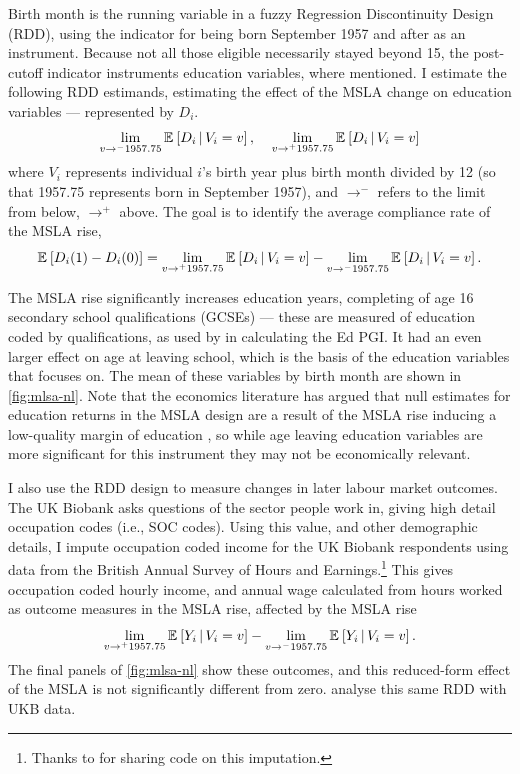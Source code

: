 Birth month is the running variable in a fuzzy Regression Discontinuity Design (RDD), using the indicator for being born September 1957 and after as an instrument.
Because not all those eligible necessarily stayed beyond 15, the post-cutoff indicator instruments education variables, where mentioned.
I estimate the following RDD estimands, estimating the effect of the MSLA change on education variables --- represented by $D_i$.
\[ \lim_{v \to^- 1957.75} \mathbb{E}_{} \left[ D_i \, \middle\vert \, V_i = v \right], \;\;\;\;
    \lim_{v \to^+ 1957.75} \mathbb{E}_{} \left[ D_i \, \middle\vert \, V_i = v \right] \]
where $V_i$ represents individual $i$'s birth year plus birth month divided by 12 (so that 1957.75 represents born in September 1957), and $\to^-$ refers to the limit from below, $\to^+$ above.
The goal is to identify the average compliance rate of the MSLA rise,
\[ \mathbb{E}_{} \left[ D_i(1) - D_i(0) \right]
    = \lim_{v \to^+ 1957.75} \mathbb{E}_{} \left[ D_i \, \middle\vert \, V_i = v \right]
        - \lim_{v \to^- 1957.75} \mathbb{E}_{} \left[ D_i \, \middle\vert \, V_i = v \right]. \]

The MSLA rise significantly increases education years, completing of age 16 secondary school qualifications (GCSEs) --- these are measured of education coded by qualifications, as used by \cite{okbay2022polygenic} in calculating the Ed PGI.
It had an even larger effect on age at leaving school, which is the basis of the education variables that \cite{barcellos2021effect} focuses on.
The mean of these variables by birth month are shown in \autoref{fig:mlsa-nl}.
Note that the economics literature has argued that null estimates for education returns in the MSLA design are a result of the MSLA rise inducing a low-quality margin of education \citep{clark2013effect}, so while age leaving education variables are more significant for this instrument they may not be economically relevant.

I also use the RDD design to measure changes in later labour market outcomes.
The UK Biobank asks questions of the sector people work in, giving high detail occupation codes (i.e., SOC codes).
Using this value, and other demographic details, I impute occupation coded income for the UK Biobank respondents using data from the British Annual Survey of Hours and Earnings.\footnote{
    Thanks to \cite{kweon2025associations} for sharing code on this imputation.
}
This gives occupation coded hourly income, and annual wage calculated from hours worked as outcome measures in the MSLA rise, affected by the MSLA rise
\[ \lim_{v \to^+ 1957.75} \mathbb{E}_{} \left[ Y_i \, \middle\vert \, V_i = v \right]
    - \lim_{v \to^- 1957.75} \mathbb{E}_{} \left[ Y_i \, \middle\vert \, V_i = v \right]. \]
The final panels of \autoref{fig:mlsa-nl} show these outcomes, and this reduced-form effect of the MSLA is not significantly different from zero.
\cite{barcellos2021effect} analyse this same RDD with UKB data.

